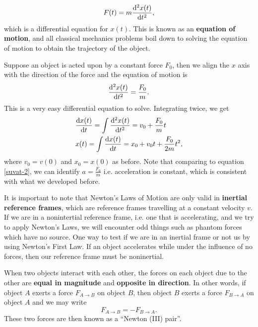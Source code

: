 \documentclass[../classical_mechanics.tex]{subfiles}
\begin{document}
        \begin{equation}
            F(t)=m\dv[2]{x(t)}{t},
        \end{equation}
        which is a differential equation for $x(t)$.
        This is known as an \textbf{equation of motion}, and all classical mechanics problems boil down to solving the equation of motion to obtain the trajectory of the object.
        \begin{example}
            Suppose an object is acted upon by a constant force $F_0$, then we align the $x$ axis with the direction of the force and the equation of motion is
            \begin{equation*}
                \dv[2]{x(t)}{t}=\frac{F_0}{m}.
            \end{equation*}
            This is a very easy differential equation to solve.
            Integrating twice, we get
            \begin{align*}
                &\dv{x(t)}{t}=\int\dv[2]{x(t)}{t}=v_0+\frac{F_0}{m}t\\
                &x(t)=\int\dv{x(t)}{t}=x_0+v_0t+\frac{F_0}{2m}t^2,
            \end{align*}
            where $v_0=v(0)$ and $x_0=x(0)$ as before.
            Note that comparing to equation \ref{suvat-2}, we can identify $a=\frac{F_0}{m}$ i.e. acceleration is constant, which is consistent with what we developed before.
        \end{example}
        It is important to note that Newton's Laws of Motion are only valid in \textbf{inertial reference frames}, which are reference frames travelling at a constant velocity $v$.
        If we are in a nonintertial reference frame, i.e. one that is accelerating, and we try to apply Newton's Laws, we will encounter odd things such as phantom forces which have no source.
        One way to test if we are in an inertial frame or not us by using Newton's First Law.
        If an object accelerates while under the influence of no forces, then our reference frame must be noninertial.
        \begin{definition}
            When two objects interact with each other, the forces on each object due to the other are \textbf{equal in magnitude} and \textbf{opposite in direction}.
            In other words, if object $A$ exerts a force $F_{A\to B}$ on object $B$, then object $B$ exerts a force $F_{B\to A}$ on object $A$ and we may write
            \begin{equation}
                F_{A\to B}=-F_{B\to A}.
            \end{equation}
            These two forces are then known as a ``Newton (III) pair''.
        \end{definition}
\end{document}
